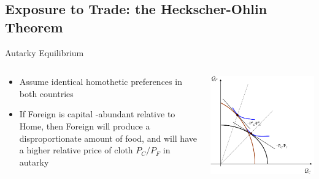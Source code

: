 \documentclass[10pt,hyperref={CJKbookmarks=true},xcolor=dvipsnames,aspectratio=169]{beamer}
\begin{document}
\subsection{Exposure to Trade: the Heckscher-Ohlin Theorem}
\begin{frame}{Autarky Equilibrium}


\begin{columns}[onlytextwidth]
\begin{column}{0.5\textwidth}
\begin{itemize}
\item Assume identical homothetic preferences in both countries 
\item If Foreign is capital -abundant relative to Home, then Foreign will
produce a disproportionate amount of food, and will have a higher
relative price of cloth $P_{C}/P_{F}$ in autarky
\end{itemize}

\end{column}
\begin{column}{0.5\textwidth}
\includegraphics[width=0.9\columnwidth]{fig/ho/lec5-11}
\end{column}
\end{columns}

\end{frame}
\end{document}
